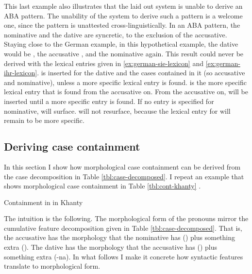 This last example also illustrates that the laid out system is unable to derive an ABA pattern. The unability of the system to derive such a pattern is a welcome one, since the pattern is unattested cross-linguistically. In an ABA pattern, the nominative and the dative are syncretic, to the exclusion of the accusative. Staying close to the German example, in this hypothetical example, the dative would be , the accusative , and the nominative  again.
This result could never be derived with the lexical entries given in \ref{ex:german-sie-lexicon} and \ref{ex:german-ihr-lexicon}.  is inserted for the dative and the cases contained in it (so accusative and nominative), unless a more specific lexical entry is found.  is the more specific lexical entry that is found from the accusative on. From the accusative on,  will be inserted until a more specific entry is found. If no entry is specified for nominative,  will surface.  will not resurface, because the lexical entry for  will remain to be more specific.


\subsection{Deriving case containment}

In this section I show how morphological case containment can be derived from the case decomposition in Table \ref{tbl:case-decomposed}. I repeat an example that shows morphological case containment in Table \ref{tbl:cont-khanty} .

\begin{table}[ht]
  \center
  \caption {Containment in  in Khanty}
    
  \label{tbl:cont-khanty-3sg}
\end{table}

The intuition is the following. The morphological form of the pronouns mirror the cumulative feature decomposition given in Table \ref{tbl:case-decomposed}. That is, the accusative has the morphology that the nominative has () plus something extra (). The dative has the morphology that the accusative has () plus something extra (-na). In what follows I make it concrete how syntactic features translate to morphological form.


